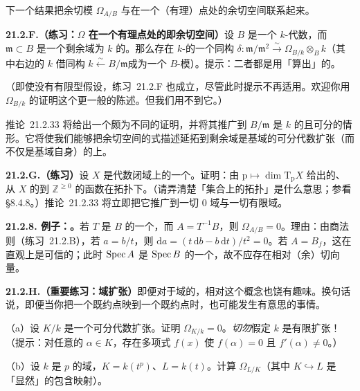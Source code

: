 下一个结果把余切模 $\Omega_{A/B}$ 与在一个（有理）点处的余切空间联系起来。

\textbf{21.2.F.（练习：$\Omega$ 在一个有理点处的\trFiber{}即余切空间）}\quad 设 $B$ 是一个\trFiniteType{} $k$-代数，而 $\mathfrak{m}\subset B$ 是一个剩余域为 $k$ 的\trMaximalIdeal。那么存在 $k$-\trVectorSpace{}的一个同构 $\delta\colon\mathfrak{m}/\mathfrak{m}^2\stackrel{\sim}{\longrightarrow}\Omega_{B/k}\otimes_B k$（其中右边的 $k$ 借同构 $k\stackrel{\sim}{\longleftarrow}B/\mathfrak{m}$成为一个 $B$-模）。提示：二者都是用\trJacobianMatrix{}「算出」的。

（即使没有有限型假设，\mbox{练习~21.2.F} 也成立，尽管此时提示不再适用。欢迎你用 $\Omega_{B/k}$ 的\trUniversalProperty{}证明这个更一般的陈述。但我们用不到它。）

\mbox{推论~21.2.33} 将给出一个颇为不同的证明，并将其推广到 $B/\mathfrak{m}$ 是 $k$ 的\trFiniteFieldExtension{}且可分的情形。它将使我们能够把\trZariski{}余切空间的\trJacobianMatrix{}式描述延拓到剩余域是基域的可分代数扩张（而不仅是基域自身）的\trClosedPoint{}上。

\textbf{21.2.G.（练习）}\quad 设 $X$ 是代数闭域上的一个\trFiniteType{}\trScheme。证明：由 $\mathrm{p}\mapsto\dim\mathrm{T}_{\mathrm{p}}X$ 给出的、从 $X$ 的\trClosedPoint{}到 $\mathbb{Z}^{\ge 0}$ 的函数在\trZariski{}拓扑下\trUpperSemicontinuous{}。（请弄清楚「\trClosedPoint{}集合上的\trZariski{}拓扑」是什么意思；参看 \S8.4.8。）\mbox{推论~21.2.33} 将立即把它推广到一切\trCharacteristic{} $0$ 域与一切有限域。

\textbf{21.2.8. 例子：\trLocalization。}\quad 若 $T$ 是 $B$ 的一个\trMultiplicativeSubset，而 $A=T^{-1}B$，则 $\Omega_{A/B}=0$。理由：由商法则（\mbox{练习~21.2.B}），若 $a=b/t$，则 $\mathrm{d}a=(t\,\mathrm{d}b-b\,\mathrm{d}t)/t^2=0$。若 $A=B_f$，这在直观上是可信的；此时 $\operatorname{Spec} A$ 是 $\operatorname{Spec} B$ 的一个\trOpenSubset，故不应存在相对（余）切向量。

\textbf{21.2.H.（重要练习：域扩张）}\quad 即便对于域的\trFiniteFieldExtension，相对\trDifferential{}这个概念也饶有趣味。换句话说，即便当你把一个既约点映到一个既约点时，\trDifferential{}也可能发生有意思的事情。

（a）设 $K/k$ 是一个可分代数扩张。证明 $\Omega_{K/k}=0$。\emph{切勿}假定 $k$ 是有限扩张！（提示：对任意的 $\alpha\in K$，存在多项式 $f(x)$ 使 $f(\alpha)=0$ 且 $f'(\alpha)\ne 0$。）

（b）设 $k$ 是\trCharacteristic{} $p$ 的域，$K=k(t^p)$、$L=k(t)$。计算 $\Omega_{L/K}$（其中 $K\hookrightarrow L$ 是「显然」的包含映射）。

